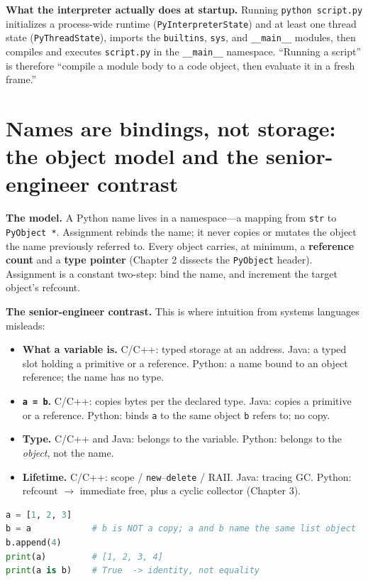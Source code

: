 \textbf{What the interpreter actually does at startup.} Running \texttt{python script.py}
initializes a process-wide runtime (\texttt{PyInterpreterState}) and at least one thread
state (\texttt{PyThreadState}), imports the \texttt{builtins}, \texttt{sys}, and
\texttt{\_\_main\_\_} modules, then compiles and executes \texttt{script.py} in the
\texttt{\_\_main\_\_} namespace. ``Running a script'' is therefore ``compile a module body to
a code object, then evaluate it in a fresh frame.''

\section{Names are bindings, not storage: the object model and the senior-engineer contrast}

\textbf{The model.} A Python name lives in a namespace---a mapping from \texttt{str} to
\texttt{PyObject *}. Assignment rebinds the name; it never copies or mutates the object the
name previously referred to. Every object carries, at minimum, a \textbf{reference count}
and a \textbf{type pointer} (Chapter 2 dissects the \texttt{PyObject} header). Assignment is
a constant two-step: bind the name, and increment the target object's refcount.

\textbf{The senior-engineer contrast.} This is where intuition from systems languages
misleads:

\begin{itemize}
  \item \textbf{What a variable is.} C/C++: typed storage at an address. Java: a typed slot
    holding a primitive or a reference. Python: a name bound to an object reference; the
    name has no type.
  \item \textbf{\texttt{a = b}.} C/C++: copies bytes per the declared type. Java: copies a
    primitive or a reference. Python: binds \texttt{a} to the same object \texttt{b} refers
    to; no copy.
  \item \textbf{Type.} C/C++ and Java: belongs to the variable. Python: belongs to the
    \emph{object}, not the name.
  \item \textbf{Lifetime.} C/C++: scope / \texttt{new}--\texttt{delete} / RAII. Java:
    tracing GC. Python: refcount $\rightarrow$ immediate free, plus a cyclic collector
    (Chapter 3).
\end{itemize}

\begin{lstlisting}[language=Python, caption={Assignment binds; it does not copy. Mutating through one name is visible through every name bound to the same object.}]
a = [1, 2, 3]
b = a            # b is NOT a copy; a and b name the same list object
b.append(4)
print(a)         # [1, 2, 3, 4]
print(a is b)    # True  -> identity, not equality
\end{lstlisting}

